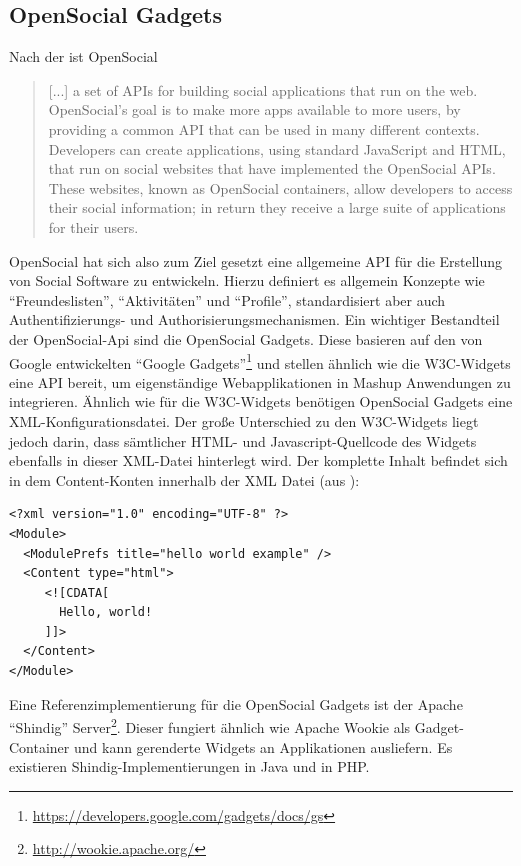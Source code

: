 \subsection{OpenSocial Gadgets}\label{section:opensocial_gadgets}
Nach der \cite{Opensocial2013} ist OpenSocial
\begin{quotation}
[...] a set of APIs for building social applications that run on the web. OpenSocial's goal is to make more apps available to more users, by providing a common API that can be used in many different contexts. Developers can create applications, using standard JavaScript and HTML, that run on social websites that have implemented the OpenSocial APIs. These websites, known as OpenSocial containers, allow developers to access their social information; in return they receive a large suite of applications for their users.
\end{quotation}
OpenSocial hat sich also zum Ziel gesetzt eine allgemeine API für die Erstellung von Social Software zu entwickeln. Hierzu definiert es allgemein Konzepte wie "`Freundeslisten"', "`Aktivitäten"' und "`Profile"', standardisiert aber auch Authentifizierungs- und Authorisierungsmechanismen. Ein wichtiger Bestandteil der OpenSocial-Api sind die OpenSocial Gadgets. Diese basieren auf den von Google entwickelten "`Google Gadgets"'\footnote{\url{https://developers.google.com/gadgets/docs/gs}} und stellen ähnlich wie die W3C-Widgets eine API bereit, um eigenständige Webapplikationen in Mashup Anwendungen zu integrieren. Ähnlich wie für die W3C-Widgets benötigen OpenSocial Gadgets eine XML-Konfigurationsdatei. Der große Unterschied zu den W3C-Widgets liegt jedoch darin, dass sämtlicher HTML- und Javascript-Quellcode des Widgets ebenfalls in dieser XML-Datei hinterlegt wird. Der komplette Inhalt befindet sich in dem Content-Konten innerhalb der XML Datei (aus \cite{GoogleGadgetsApi2012}): 
\begin{lstlisting}
<?xml version="1.0" encoding="UTF-8" ?> 
<Module>
  <ModulePrefs title="hello world example" /> 
  <Content type="html">
     <![CDATA[ 
       Hello, world!
     ]]>
  </Content> 
</Module>
\end{lstlisting}
Eine Referenzimplementierung für die OpenSocial Gadgets ist der Apache "`Shindig"' Server\footnote{\url{http://wookie.apache.org/}}. Dieser fungiert ähnlich wie Apache Wookie als Gadget-Container und kann gerenderte Widgets an Applikationen ausliefern. Es existieren Shindig-Implementierungen in Java und in PHP.

